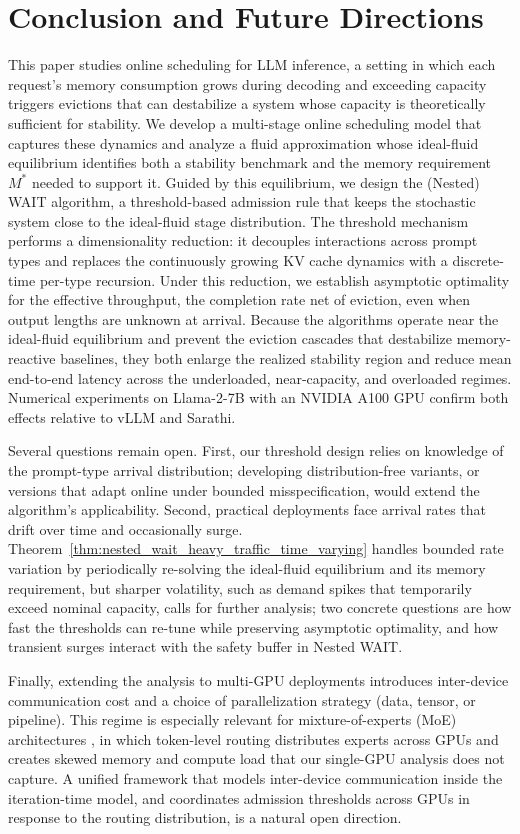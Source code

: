 \section{Conclusion and Future Directions}

This paper studies online scheduling for LLM inference, a setting in which each request's memory consumption grows during decoding and exceeding capacity triggers evictions that can destabilize a system whose capacity is theoretically sufficient for stability. We develop a multi-stage online scheduling model that captures these dynamics and analyze a fluid approximation whose ideal-fluid equilibrium identifies both a stability benchmark and the memory requirement \(M^*\) needed to support it. Guided by this equilibrium, we design the (Nested) WAIT algorithm, a threshold-based admission rule that keeps the stochastic system close to the ideal-fluid stage distribution. The threshold mechanism performs a dimensionality reduction: it decouples interactions across prompt types and replaces the continuously growing KV cache dynamics with a discrete-time per-type recursion. Under this reduction, we establish asymptotic optimality for the effective throughput, the completion rate net of eviction, even when output lengths are unknown at arrival. Because the algorithms operate near the ideal-fluid equilibrium and prevent the eviction cascades that destabilize memory-reactive baselines, they both enlarge the realized stability region and reduce mean end-to-end latency across the underloaded, near-capacity, and overloaded regimes. Numerical experiments on Llama-2-7B with an NVIDIA A100 GPU confirm both effects relative to vLLM and Sarathi.

Several questions remain open. First, our threshold design relies on knowledge of the prompt-type arrival distribution; developing distribution-free variants, or versions that adapt online under bounded misspecification, would extend the algorithm's applicability. Second, practical deployments face arrival rates that drift over time and occasionally surge. Theorem~\ref{thm:nested_wait_heavy_traffic_time_varying} handles bounded rate variation by periodically re-solving the ideal-fluid equilibrium and its memory requirement, but sharper volatility, such as demand spikes that temporarily exceed nominal capacity, calls for further analysis; two concrete questions are how fast the thresholds can re-tune while preserving asymptotic optimality, and how transient surges interact with the safety buffer in Nested WAIT.

Finally, extending the analysis to multi-GPU deployments introduces inter-device communication cost and a choice of parallelization strategy (data, tensor, or pipeline). This regime is especially relevant for mixture-of-experts (MoE) architectures \citep{shazeer2017outrageously, fedus2022switch, jiang2024mixtral}, in which token-level routing distributes experts across GPUs and creates skewed memory and compute load that our single-GPU analysis does not capture. A unified framework that models inter-device communication inside the iteration-time model, and coordinates admission thresholds across GPUs in response to the routing distribution, is a natural open direction.
